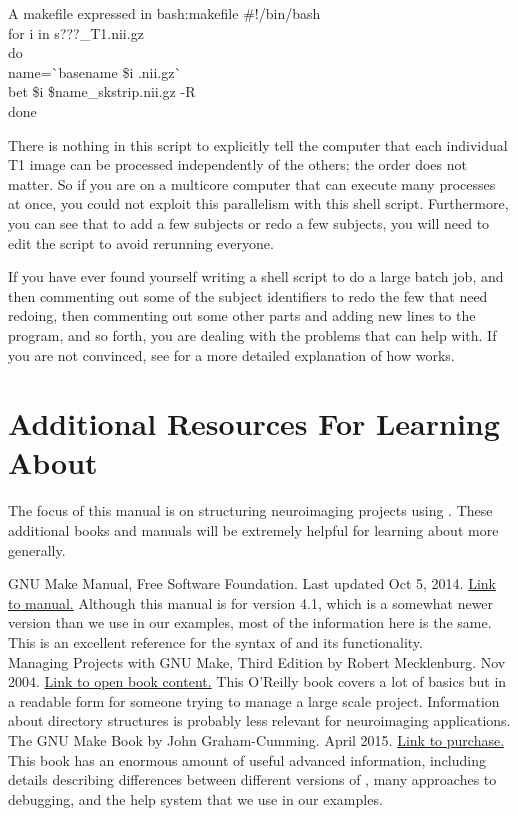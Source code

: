 \begin{bash}{A makefile expressed in \bashn{}}{bash:makefile}
	\#!/bin/bash \\
	for i in s???_T1.nii.gz \\
	do \\
	name=\`{}basename \$i .nii.gz\`{} \\
	bet \$i \${name}_skstrip.nii.gz -R \\
	done
\end{bash}
	
There is nothing in this script to explicitly tell the computer that each individual T1 image can be processed independently of the others; the order does not matter. So if you are on a multicore computer that can execute many processes at once, you could not exploit this parallelism with this shell script. Furthermore, you can see that to add a few subjects or redo a few subjects, you will need to edit the script to avoid rerunning everyone. 
	
If you have ever found yourself writing a shell script to do a large batch job, and then commenting out some of the subject identifiers to redo the few that need redoing, then commenting out some other parts and adding new lines to the program, and so forth, you are dealing with the problems that \maken{} can help with. If you are not convinced, see  for a more detailed explanation of how \maken{} works. 

\section{Additional Resources For Learning About \maken{}}
The focus of this manual is on structuring neuroimaging projects using \maken{}. These additional books and manuals will be extremely helpful for learning about \maken{} more generally.

GNU Make Manual, Free Software Foundation. Last updated Oct 5, 2014. \href{http://www.gnu.org/software/make/manual/}{Link to manual.} Although this manual is for version 4.1, which is a somewhat newer version than we use in our examples, most of the information here is the same. This is an excellent reference for the syntax of \maken{} and its functionality. 
\\

Managing Projects with GNU Make, Third Edition by Robert Mecklenburg. Nov 2004. \href{http://www.oreilly.com/openbook/make3/book/index.csp}{Link to open book content.} This O'Reilly book covers a lot of basics but in a readable form for someone trying to manage a large scale project. Information about directory structures is probably less relevant for neuroimaging applications. 
\\

The GNU Make Book by John Graham-Cumming. April 2015. \href{https://www.nostarch.com/gnumake}{Link to purchase.} This book has an enormous amount of useful advanced information, including details describing differences between different versions of \maken{}, many approaches to debugging, and the help system that we use in our examples. 
